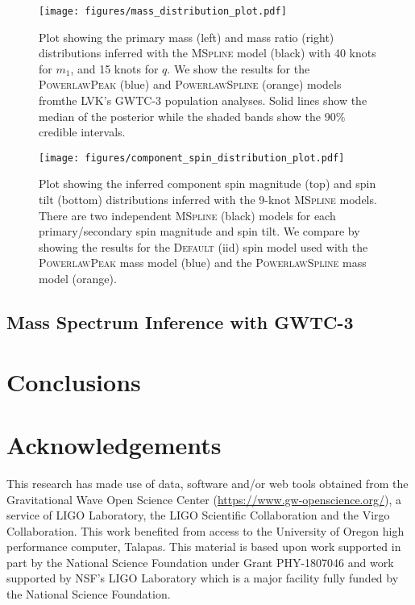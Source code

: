 \documentclass[twocolumn, linenumber]{aastex63}
\begin{document}
\begin{figure*}[ht!]
    \begin{centering}
        \texttt{[image: figures/mass\_distribution\_plot.pdf]}
        \caption{Plot showing the primary mass (left) and mass ratio (right) distributions inferred with the 
        \textsc{MSpline} model (black) with 40 knots for $m_1$, and 15 knots for $q$. We show the results for the \textsc{PowerlawPeak} (blue) and 
        \textsc{PowerlawSpline} (orange) models fromthe LVK's GWTC-3 population analyses. Solid lines show the median of the posterior while the shaded
        bands show the 90\% credible intervals.}
        \label{fig:mass_distribution}
    \end{centering}
\end{figure*}


\begin{figure*}[ht!]
    \begin{centering}
        \texttt{[image: figures/component\_spin\_distribution\_plot.pdf]}
        \caption{Plot showing the inferred component spin magnitude (top) and spin tilt (bottom) distributions inferred with the 9-knot \textsc{MSpline} models. 
        There are two independent \textsc{MSpline} (black) models for each primary/secondary spin magnitude and spin tilt. We compare by showing the results for the
        \textsc{Default} (iid) spin model used with the \textsc{PowerlawPeak} mass model (blue) and the \textsc{PowerlawSpline} mass model (orange).}
        \label{fig:component_spin_distribution}
    \end{centering}
\end{figure*}


\subsection{Mass Spectrum Inference with GWTC-3} \label{sec:GWTC3_inferece}
\section{Conclusions}\label{sec:conclusion}
\section{Acknowledgements}\label{sec:acknowledments}
This research has made use of data, software and/or web tools obtained from the Gravitational Wave Open Science Center 
(\url{https://www.gw-openscience.org/}), a service of LIGO Laboratory, the LIGO Scientific Collaboration and the Virgo Collaboration. 
This work benefited from access to the University of Oregon high performance computer, Talapas.  This material is based upon work supported 
in part by the National Science Foundation under Grant PHY-1807046 and work supported by NSF’s LIGO Laboratory which is a major facility 
fully funded by the National Science Foundation.
{}

\end{document}
